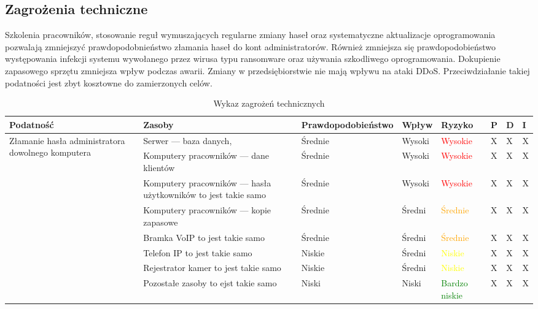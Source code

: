 \subsection{Zagrożenia techniczne}
Szkolenia pracowników, stosowanie reguł wymuszających regularne zmiany haseł oraz systematyczne aktualizacje oprogramowania pozwalają zmniejszyć prawdopodobnieństwo złamania haseł do kont administratorów. Również zmniejsza się prawdopodobieństwo występowania infekcji systemu wywołanego przez wirusa typu ransomware oraz używania szkodliwego oprogramowania. Dokupienie zapasowego sprzętu zmniejsza wpływ podczas awarii. Zmiany w przedsiębiorstwie nie mają wpływu na ataki DDoS. Przeciwdziałanie takiej podatności jest zbyt kosztowne do zamierzonych celów.


\begin{landscape}
	\begin{longtable}[ht!]{|m{3cm}|m{6cm}|m{4.5cm}|m{3cm}|m{3cm}|m{0.5cm}|m{0.5cm}|m{0.5cm}|}
		\caption{Wykaz zagrożeń technicznych}
		\label{tab:zagrozenia_techniczne}\\
		\hline	
		\textbf{Podatność} & \textbf{Zasoby} & \textbf{Prawdopodobieństwo} & \textbf{Wpływ} &  \textbf{Ryzyko} & \textbf{P} & \textbf{D} & \textbf{I} \\ \hline
		\multirow{5}{4cm}{Złamanie hasła administratora dowolnego komputera}  
		&   Serwer --- baza danych,  & Średnie & Wysoki & \textcolor{red}{Wysokie} & X & X & X  \\ \cline{2-8}
		& Komputery pracowników --- dane klientów & Średnie & Wysoki & \textcolor{red}{Wysokie}  & X & X & X  \\ \cline{2-8}
		& Komputery pracowników --- hasła użytkowników to jest takie samo & Średnie & Wysoki & \textcolor{red}{Wysokie}  & X & X & X  \\ \cline{2-8}
		& Komputery pracowników --- kopie zapasowe & Średnie & Średni & \textcolor{orange}{Średnie}  & X & X & X  \\ \cline{2-8}
		& Bramka VoIP to jest takie samo & Średnie & Średni & \textcolor{orange}{Średnie}  & X & X & X  \\ \cline{2-8}
		& Telefon IP to jest takie samo & Niskie & Średni & \textcolor{yellow}{Niskie}  & X & X & X  \\ \cline{2-8}
		& Rejestrator kamer to jest takie samo & Niskie & Średni & \textcolor{yellow}{Niskie}  & X & X & X  \\ \cline{2-8}
		& Pozostałe zasoby to ejst takie samo & Niski & Niski & \textcolor{green}{Bardzo niskie} & X & X & X  \\ \cline{2-8}

\end{longtable}
\end{landscape}
